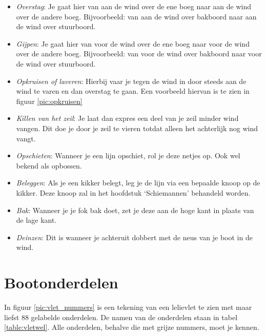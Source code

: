\begin{itemize}
    \item \textit{Overstag}: Je gaat hier van aan de wind over de ene boeg naar aan de wind over de andere boeg. Bijvoorbeeld: van aan de wind over bakboord naar aan de wind over stuurboord.
    \item \textit{Gijpen}: Je gaat hier van voor de wind over de ene boeg naar voor de wind over de andere boeg. Bijvoorbeeld: van voor de wind over bakboord naar voor de wind over stuurboord.
    \item \textit{Opkruisen of laveren}: Hierbij vaar je tegen de wind in door steeds aan de wind te varen en dan overstag te gaan. Een voorbeeld hiervan is te zien in figuur \ref{pic:opkruisen}
    \item \textit{Killen van het zeil}: Je laat dan expres een deel van je zeil minder wind vangen. Dit doe je door je zeil te vieren totdat alleen het achterlijk nog wind vangt.
    \item \textit{Opschieten}: Wanneer je een lijn opschiet, rol je deze netjes op. Ook wel bekend als opbossen.
    \item \textit{Beleggen}: Als je een kikker belegt, leg je de lijn via een bepaalde knoop op de kikker. Deze knoop zal in het hoofdstuk `Schiemannen' behandeld worden.
    \item \textit{Bak}: Wanneer je je fok bak doet, zet je deze aan de hoge kant in plaats van de lage kant.
    \item \textit{Deinzen}: Dit is wanneer je achteruit dobbert met de neus van je boot in de wind. 
\end{itemize}


\newpage

\section{Bootonderdelen}
In figuur \ref{pic:vlet_nummers} is een tekening van een lelievlet te zien met maar liefst 88 gelabelde onderdelen. De namen van de onderdelen staan in tabel \ref{table:vletwel}. Alle onderdelen, behalve die met grijze nummers, moet je kennen.

